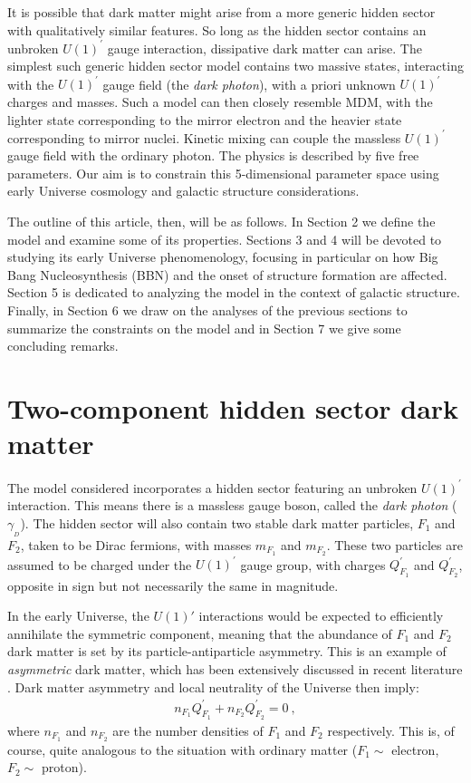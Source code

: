 \documentclass[12pt]{article}
\begin{document}
It is possible that dark matter might arise from a more generic hidden sector with qualitatively similar features. So long as the hidden sector contains an unbroken $U(1) ^{'}$ gauge interaction, dissipative dark matter can arise. The simplest such generic hidden sector model contains two massive states, interacting with the $U(1) ^{'}$ gauge field (the \textit{dark photon}), with a priori unknown $U(1) ^{'}$ charges and masses. Such a model can then closely resemble MDM, with the lighter state corresponding to the mirror electron and the heavier state corresponding to mirror nuclei. Kinetic mixing can couple the massless $U(1) ^{'}$ gauge field with the ordinary photon. The physics is described by five free parameters. Our aim is to constrain this 5-dimensional parameter space using early Universe cosmology and galactic structure considerations.

The outline of this article, then, will be as follows. In Section 2 we define the model and examine some of its properties. Sections 3 and 4 will be devoted to studying its early Universe phenomenology, focusing in particular on how Big Bang Nucleosynthesis (BBN) and the onset of structure formation are affected. Section 5 is dedicated to analyzing the model in the context of galactic structure. Finally, in Section 6 we draw on the analyses of the previous sections to summarize the constraints on the model and in Section 7 we give some concluding remarks.

\section{Two-component hidden sector dark matter}

The model considered incorporates a hidden sector featuring an unbroken $U(1) ^{'}$ interaction. This means there is a massless gauge boson, called the \textit{dark photon} ($\gamma _{_D}$). The hidden sector will also contain two stable dark matter particles, $F_1$ and $F_2$, taken to be Dirac fermions, with masses $m _{F_1}$ and $m _{F_2}$. These two particles are assumed to be charged under the $U(1) ^{'}$ gauge group, with charges $Q _{F_1} ^{'}$ and $Q _{F_2} ^{'}$, opposite in sign but not necessarily the same in magnitude.

In the early Universe, the $U(1)'$ interactions would be expected to efficiently annihilate the symmetric component, meaning that the abundance of $F_1$ and $F_2$ dark matter is set by its particle-antiparticle asymmetry. This is an example of \textit{asymmetric} dark matter, which has been extensively discussed in recent literature \cite{reviewadm}. Dark matter asymmetry and local neutrality of the Universe then imply:
%
\begin{eqnarray}
n _{F_1}Q _{F_1} ^{'} + n _{F_2}Q _{F_2} ^{'} = 0 \ ,
\end{eqnarray}
%
where $n _{F_1}$ and $n _{F_2}$ are the number densities of $F _1$ and $F _2$ respectively. This is, of course, quite analogous to the situation with ordinary matter ($F_1 \sim$ electron, $F_2 \sim$ proton).
\end{document}
